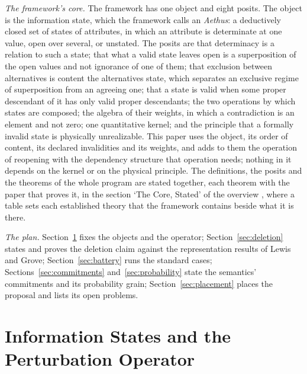 \emph{The framework's core.} The framework has one object and eight posits. The object is the information state, which the framework calls an \emph{Aethus}: a deductively closed set of states of attributes, in which an attribute is determinate at one value, open over several, or unstated. The posits are that determinacy is a relation to such a state; that what a valid state leaves open is a superposition of the open values and not ignorance of one of them; that exclusion between alternatives is content the alternatives state, which separates an exclusive regime of superposition from an agreeing one; that a state is valid when some proper descendant of it has only valid proper descendants; the two operations by which states are composed; the algebra of their weights, in which a contradiction is an element and not zero; one quantitative kernel; and the principle that a formally invalid state is physically unrealizable. This paper uses the object, its order of content, its declared invalidities and its weights, and adds to them the operation of reopening with the dependency structure that operation needs; nothing in it depends on the kernel or on the physical principle. The definitions, the posits and the theorems of the whole program are stated together, each theorem with the paper that proves it, in the section `The Core, Stated' of the overview \parencite{AethusBrief}, where a table sets each established theory that the framework contains beside what it is there.

\emph{The plan.} Section~\ref{sec:machinery} fixes the objects and the operator; Section~\ref{sec:deletion} states and proves the deletion claim against the representation results of Lewis and Grove; Section~\ref{sec:battery} runs the standard cases; Sections~\ref{sec:commitments} and~\ref{sec:probability} state the semantics' commitments and its probability grain; Section~\ref{sec:placement} places the proposal and lists its open problems.

\section{Information States and the Perturbation Operator}\label{sec:machinery}

